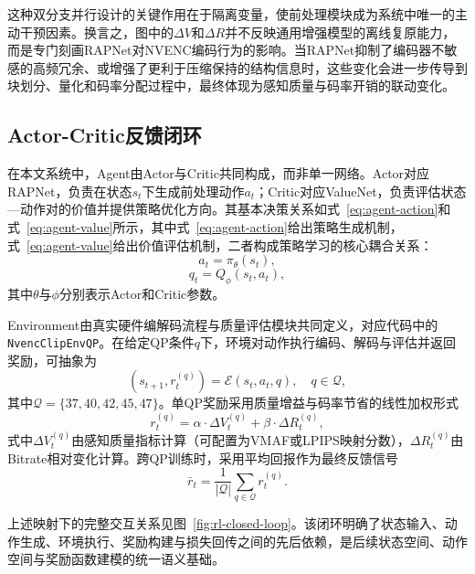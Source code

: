 这种双分支并行设计的关键作用在于隔离变量，使前处理模块成为系统中唯一的主动干预因素。换言之，图中的$\Delta V$和$\Delta R$并不反映通用增强模型的离线复原能力，而是专门刻画RAPNet对NVENC编码行为的影响。当RAPNet抑制了编码器不敏感的高频冗余、或增强了更利于压缩保持的结构信息时，这些变化会进一步传导到块划分、量化和码率分配过程中，最终体现为感知质量与码率开销的联动变化。

\subsection{Actor-Critic反馈闭环}

在本文系统中，Agent由Actor与Critic共同构成，而非单一网络。Actor对应RAPNet，负责在状态$s_t$下生成前处理动作$a_t$；Critic对应ValueNet，负责评估状态—动作对的价值并提供策略优化方向。其基本决策关系如式~\eqref{eq:agent-action}和式~\eqref{eq:agent-value}所示，其中式~\eqref{eq:agent-action}给出策略生成机制，式~\eqref{eq:agent-value}给出价值评估机制，二者构成策略学习的核心耦合关系：
\begin{equation}
  a_t = \pi_{\theta}(s_t),
  \label{eq:agent-action}
\end{equation}
\begin{equation}
  q_t = Q_{\phi}(s_t, a_t),
  \label{eq:agent-value}
\end{equation}
其中$\theta$与$\phi$分别表示Actor和Critic参数。

Environment由真实硬件编解码流程与质量评估模块共同定义，对应代码中的\texttt{NvencClipEnvQP}。在给定QP条件$q$下，环境对动作执行编码、解码与评估并返回奖励，可抽象为
\begin{equation}
  (s_{t+1}, r_t^{(q)}) = \mathcal{E}(s_t, a_t, q), \quad q \in \mathcal{Q},
  \label{eq:env-step}
\end{equation}
其中$\mathcal{Q}=\{37,40,42,45,47\}$。单QP奖励采用质量增益与码率节省的线性加权形式
\begin{equation}
  r_t^{(q)} = \alpha \cdot \Delta V_t^{(q)} + \beta \cdot \Delta R_t^{(q)},
  \label{eq:reward-qp-intro}
\end{equation}
式中$\Delta V_t^{(q)}$由感知质量指标计算（可配置为VMAF或LPIPS映射分数），$\Delta R_t^{(q)}$由Bitrate相对变化计算。跨QP训练时，采用平均回报作为最终反馈信号
\begin{equation}
  \bar{r}_t = \frac{1}{|\mathcal{Q}|}\sum_{q\in\mathcal{Q}} r_t^{(q)}.
  \label{eq:reward-mean-intro}
\end{equation}

上述映射下的完整交互关系见图~\ref{fig:rl-closed-loop}。该闭环明确了状态输入、动作生成、环境执行、奖励构建与损失回传之间的先后依赖，是后续状态空间、动作空间与奖励函数建模的统一语义基础。

